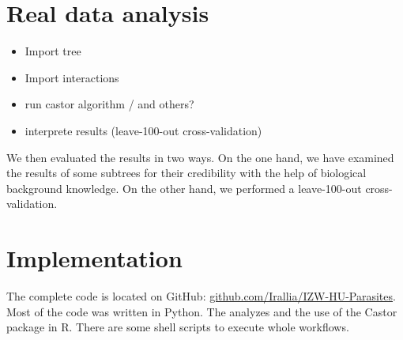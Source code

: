   \section{Real data analysis} \label{sec:methods - real data analysis}
    \begin{itemize}
      \item Import tree
      \item Import interactions
      \item run castor algorithm / and others?
      \item interprete results (leave-100-out cross-validation)
    \end{itemize}
    We then evaluated the results in two ways. On the one hand, we have examined the results of some 
      subtrees for their credibility with the help of biological background knowledge. On the other 
      hand, we performed a leave-100-out cross-validation.

  \section{Implementation}
    The complete code is located on GitHub: 
      \hyperlink{github.com/Irallia/IZW-HU-Parasites}{github.com/Irallia/IZW-HU-Parasites}. \\
    Most of the code was written in Python. The analyzes and the use of the Castor package in R. There 
      are some shell scripts to execute whole workflows.

